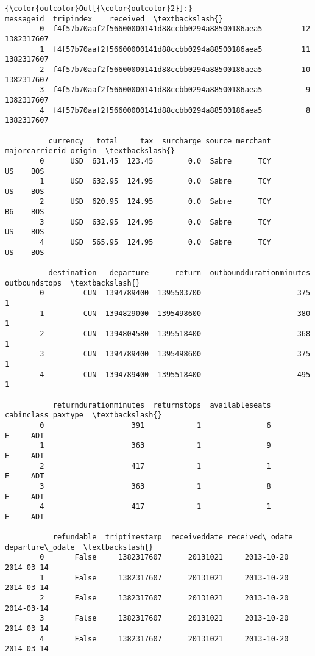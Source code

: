 \documentclass[11pt]{article}
\begin{document}
\begin{Verbatim}[commandchars=\\\{\}]
{\color{outcolor}Out[{\color{outcolor}2}]:}                                           messageid  tripindex    received  \textbackslash{}
        0  f4f57b70aaf2f56600000141d88ccbb0294a88500186aea5         12  1382317607   
        1  f4f57b70aaf2f56600000141d88ccbb0294a88500186aea5         11  1382317607   
        2  f4f57b70aaf2f56600000141d88ccbb0294a88500186aea5         10  1382317607   
        3  f4f57b70aaf2f56600000141d88ccbb0294a88500186aea5          9  1382317607   
        4  f4f57b70aaf2f56600000141d88ccbb0294a88500186aea5          8  1382317607   
        
          currency   total     tax  surcharge source merchant majorcarrierid origin  \textbackslash{}
        0      USD  631.45  123.45        0.0  Sabre      TCY             US    BOS   
        1      USD  632.95  124.95        0.0  Sabre      TCY             US    BOS   
        2      USD  620.95  124.95        0.0  Sabre      TCY             B6    BOS   
        3      USD  632.95  124.95        0.0  Sabre      TCY             US    BOS   
        4      USD  565.95  124.95        0.0  Sabre      TCY             US    BOS   
        
          destination   departure      return  outbounddurationminutes  outboundstops  \textbackslash{}
        0         CUN  1394789400  1395503700                      375              1   
        1         CUN  1394829000  1395498600                      380              1   
        2         CUN  1394804580  1395518400                      368              1   
        3         CUN  1394789400  1395498600                      375              1   
        4         CUN  1394789400  1395518400                      495              1   
        
           returndurationminutes  returnstops  availableseats cabinclass paxtype  \textbackslash{}
        0                    391            1               6          E     ADT   
        1                    363            1               9          E     ADT   
        2                    417            1               1          E     ADT   
        3                    363            1               8          E     ADT   
        4                    417            1               1          E     ADT   
        
           refundable  triptimestamp  receiveddate received\_odate departure\_odate  \textbackslash{}
        0       False     1382317607      20131021     2013-10-20      2014-03-14   
        1       False     1382317607      20131021     2013-10-20      2014-03-14   
        2       False     1382317607      20131021     2013-10-20      2014-03-14   
        3       False     1382317607      20131021     2013-10-20      2014-03-14   
        4       False     1382317607      20131021     2013-10-20      2014-03-14   
        

\end{Verbatim}
\end{document}
